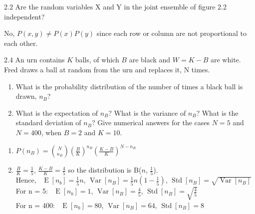 \documentclass[12pt, a4paper]{article}
\begin{document}
\begin{prob}{2.2}
Are the random variables X and Y in the joint ensemble
of figure 2.2 independent?
\end{prob}
\begin{sol}
No, $P(x, y) \neq P(x)P(y)$ since each row or column are not proportional to each other.
\end{sol}
\bigskip

\begin{prob}{2.4}
An urn contains $K$ balls, of which $B$ are black and $W = K - B$ are white. Fred draws a ball at random from the urn and replaces
it, N times.
\begin{enumerate}
    \item[(a)] What is the probability distribution of the number of times a black
ball is drawn, $n_B$?
    \item[(b)] What is the expectation of $n_B$? What is the variance of $n_B$? What
is the standard deviation of $n_B$? Give numerical answers for the
cases $N = 5$ and $N = 400$, when $B = 2$ and $K = 10$.
\end{enumerate}
\end{prob}
\begin{sol}
\begin{enumerate}
\item[(a)] $P(n_B) = \binom{N}{n_B} (\frac{B}{K})^{n_B} (\frac{K - B}{K})^{N - n_B}$
\item[(b)] $\frac{B}{K} = \frac{1}{5}$, $\frac{K-B}{K} = \frac{4}{5}$ so the distribution is B($n$, $\frac{1}{5}$). \\[2ex]
Hence, \, $\operatorname{E}[n_b] = \frac{1}{5}n$, $\operatorname{Var}[n_B] = \frac{1}{5}n(1-\frac{1}{5})$, $\operatorname{Std}[n_B] = \sqrt{\operatorname{Var}[n_B]}$ \\[2ex]
For n = 5: \, $\operatorname{E}[n_b] = 1$, $\operatorname{Var}[n_B] = \frac{4}{5}$, $\operatorname{Std}[n_B] = \sqrt{\frac{4}{5}}$ \\[2ex]
For n = 400: \, $\operatorname{E}[n_b] = 80$, $\operatorname{Var}[n_B] = 64$, $\operatorname{Std}[n_B] = 8$ \\
\end{enumerate}
\end{sol}
\bigskip
\end{document}
